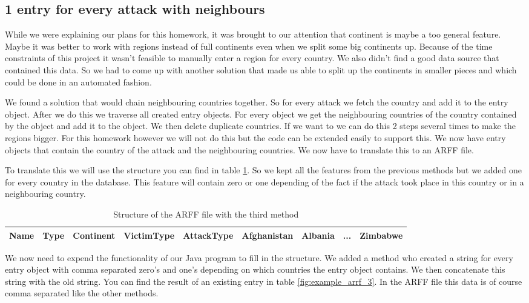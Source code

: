 \documentclass[a4]{article}
\begin{document}
\subsection{1 entry for every attack with neighbours}
While we were explaining our plans for this homework, it was brought to our attention that continent is maybe a too general feature. Maybe it was better to work with regions instead of full continents even when we split some big continents up. Because of the time constraints of this project it wasn't feasible to manually enter a region for every country. We also didn't find a good data source that contained this data. So we had to come up with another solution that made us able to split up the continents in smaller pieces and which could be done in an automated fashion.\par
We found a solution that would chain neighbouring  countries together. So for every attack we fetch the country and add it to the entry object. After we do this we traverse all created entry objects. For every object we get the neighbouring countries of the country contained by the object and add it to the object. We then delete duplicate countries. If we want to we can do this 2 steps several times to make the regions bigger. For this homework however we will not do this but the code can be extended easily to support this. We now have entry objects that contain the country of the attack and the neighbouring countries. We now have to translate this to an ARFF file.\par
To translate this we will use the structure you can find in table \ref{fig:structure_arrf_3}. So we kept all the features from the previous methods but we added one for every country in the database. This feature will contain zero or one depending of the fact if the attack took place in this country or in a neighbouring country.\par
\begin{table}[!h]
\centering
\begin{tabular}{|c|c|c|c|c|c|c|c|c|}\hline
Name & Type & Continent & VictimType & AttackType & Afghanistan & Albania & ... & Zimbabwe \\ \hline
\end{tabular}
\caption{Structure of the ARFF file with the third method}
\label{fig:structure_arrf_3}
\end{table}
We now need to expend the functionality of our Java program to fill in the structure. We added a method who created a string for every entry object with comma separated zero's and one's depending on which countries the entry object contains. We then concatenate this string with the old string. You can find the result of an existing entry in table \ref{fig:example_arrf_3}. In the ARFF file this data is of course comma separated like the other methods.\par
\end{document}
